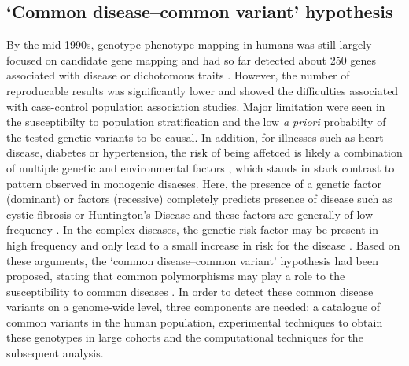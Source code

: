 \subsection{`Common disease–common variant' hypothesis}
By the mid-1990s, genotype-phenotype mapping in humans was still largely focused on candidate gene mapping and had so far detected about 250 genes associated with disease or dichotomous traits \citep{Hirschhorn2002}. However, the number of reproducable results was significantly lower and showed the difficulties associated with case-control population association studies. Major limitation were seen in the susceptibilty to population stratification \citep{Lohmuller2003} and the low \textit{a priori} probabilty of the tested genetic variants to be causal. In addition, for illnesses such as heart disease, diabetes or hypertension, the risk of being affetced is likely a combination of multiple genetic and environmental factors \citep{Hunter2005}, which stands in stark contrast to pattern observed in monogenic disaeses. Here, the presence of a genetic factor (dominant) or factors (recessive) completely predicts presence of disease such as cystic fibrosis or Huntington's Disease and these factors are generally of low frequency \citep{Sankaranarayanan1998}.  In the complex diseases, the genetic risk factor may be present in high frequency and only lead to a small increase in risk for the disease \citep{Reich2001}. Based on these arguments, the `common disease–common variant' hypothesis had been proposed, stating that common polymorphisms may play a role to the susceptibility to common diseases \citep{Risch1996,Lander1996,Chakravarti1999,Reich2001}. In order to  detect these common disease variants on a genome-wide level, three components are needed: a catalogue of common variants in the human population, experimental techniques to obtain these genotypes in large cohorts and the computational techniques for the subsequent analysis.

